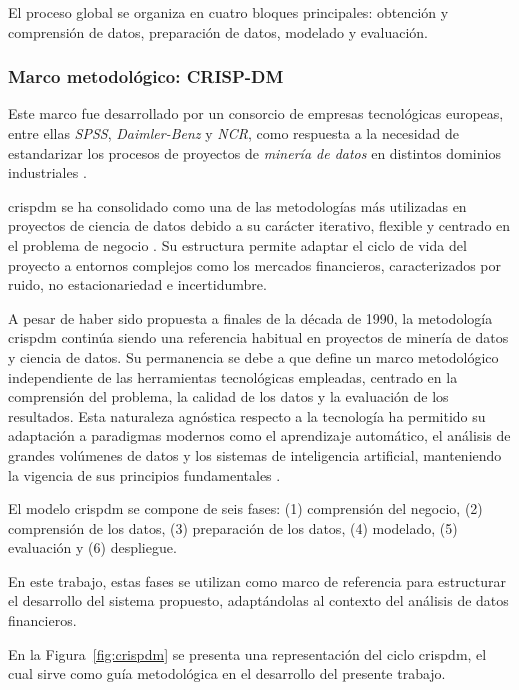 \documentclass[
]{article}
\begin{document}
El proceso global se organiza en cuatro bloques principales:
obtención y comprensión de datos, preparación de datos, modelado y evaluación.

\subsubsection{Marco metodológico: CRISP-DM}

Este marco fue desarrollado por un consorcio de empresas tecnológicas
europeas, entre ellas \emph{SPSS}, \emph{Daimler-Benz} y \emph{NCR}, como
respuesta a la necesidad de estandarizar los procesos de proyectos de
\emph{minería de datos} en distintos dominios industriales
\parencite{Chapman2000CRISPDM1S}.

\gls{crispdm} se ha consolidado como una de las metodologías más utilizadas en
proyectos de ciencia de datos debido a su carácter iterativo, flexible y
centrado en el problema de negocio \parencite{wirth2000crisp}. Su estructura
permite adaptar el ciclo de vida del proyecto a entornos complejos como los
mercados financieros, caracterizados por ruido, no estacionariedad e
incertidumbre.

A pesar de haber sido propuesta a finales de la década de 1990, la metodología 
\gls{crispdm} continúa siendo una referencia habitual en proyectos de minería 
de datos y ciencia de datos. Su permanencia se debe a que define un marco 
metodológico independiente de las herramientas tecnológicas empleadas, 
centrado en la comprensión del problema, la calidad de los datos y la 
evaluación de los resultados. Esta naturaleza agnóstica respecto a la 
tecnología ha permitido su adaptación a paradigmas modernos como el 
aprendizaje automático, el análisis de grandes volúmenes de datos y 
los sistemas de inteligencia artificial, manteniendo la vigencia de 
sus principios fundamentales \parencite{SCHROER2021526,espinosa2020crispdm}.

El modelo \gls{crispdm} se compone de seis fases:
(1) comprensión del negocio,
(2) comprensión de los datos,
(3) preparación de los datos,
(4) modelado,
(5) evaluación y
(6) despliegue.

En este trabajo, estas fases se utilizan como marco de referencia para
estructurar el desarrollo del sistema propuesto, adaptándolas al contexto
del análisis de datos financieros.

En la Figura~\ref{fig:crispdm} se presenta una representación del ciclo \gls{crispdm}, el cual sirve como guía metodológica en el desarrollo del presente trabajo.
\end{document}
